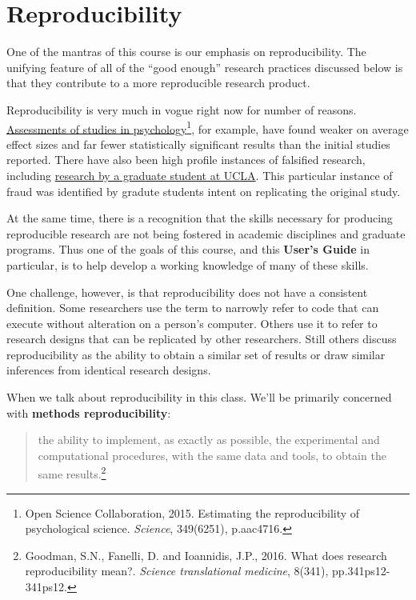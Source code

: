 \documentclass[]{book}
\let\rmarkdownfootnote\footnote%
\def\footnote{\protect\rmarkdownfootnote}
\begin{document}
\section{Reproducibility}\label{reproducibility}

One of the mantras of this course is our emphasis on reproducibility.
The unifying feature of all of the ``good enough'' research practices
discussed below is that they contribute to a more reproducible research
product.

Reproducibility is very much in vogue right now for number of reasons.
\href{http://science.sciencemag.org/content/349/6251/aac4716}{Assessments
of studies in psychology}\footnote{Open Science Collaboration, 2015.
  Estimating the reproducibility of psychological science.
  \emph{Science}, 349(6251), p.aac4716.}, for example, have found weaker
on average effect sizes and far fewer statistically significant results
than the initial studies reported. There have also been high profile
instances of falsified research, including
\href{http://nymag.com/scienceofus/2015/05/how-a-grad-student-uncovered-a-huge-fraud.html}{research
by a graduate student at UCLA}. This particular instance of fraud was
identified by gradute students intent on replicating the original study.

At the same time, there is a recognition that the skills necessary for
producing reproducible research are not being fostered in academic
disciplines and graduate programs. Thus one of the goals of this course,
and this \textbf{User's Guide} in particular, is to help develop a
working knowledge of many of these skills.

One challenge, however, is that reproducibility does not have a
consistent definition. Some researchers use the term to narrowly refer
to code that can execute without alteration on a person's computer.
Others use it to refer to research designs that can be replicated by
other researchers. Still others discuss reproducibility as the ability
to obtain a similar set of results or draw similar inferences from
identical research designs.

When we talk about reproducibility in this class. We'll be primarily
concerned with \textbf{methods reproducibility}:

\begin{quote}
the ability to implement, as exactly as possible, the experimental and
computational procedures, with the same data and tools, to obtain the
same results.\footnote{Goodman, S.N., Fanelli, D. and Ioannidis, J.P.,
  2016. What does research reproducibility mean?. \emph{Science
  translational medicine}, 8(341), pp.341ps12-341ps12.}
\end{quote}
\end{document}
